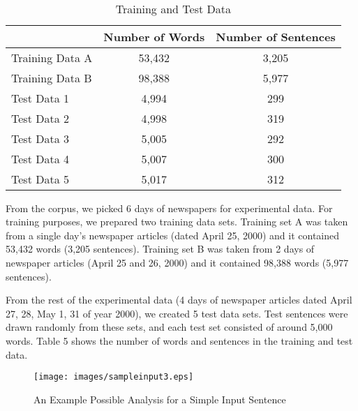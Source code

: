 \documentclass[english]{nlp}
\begin{document}
\begin{table}[ht]
\begin{center}
\caption{Training and Test Data}
~\\\vspace{-2mm}
\label{table:train_test_data}
\begin{tabular}{|l|c|c|}
\cline{2-3}
\multicolumn{1}{c|}{~} & {\small Number of Words} & {\small Number of Sentences}\\
\hline
\hline
{\small Training Data A} & {\small 53,432} & {\small 3,205}\\
\hline
{\small Training Data B} & {\small 98,388} & {\small 5,977}\\
\hline
\hline
{\small Test Data 1} & {\small 4,994} & {\small 299}\\
\hline
{\small Test Data 2} & {\small 4,998} & {\small 319}\\
\hline
{\small Test Data 3} & {\small 5,005} & {\small 292}\\
\hline
{\small Test Data 4} & {\small 5,007} & {\small 300}\\
\hline
{\small Test Data 5} & {\small 5,017} & {\small 312}\\
\hline
\end{tabular}
\end{center}
\end{table}

From the corpus, we picked 6 days of newspapers for experimental data.
For training purposes, we prepared two training data sets. Training set A
was taken from a single day's newspaper articles (dated April 25, 2000) and it
contained 53,432 words (3,205 sentences). 
Training set B was taken from 2 days of newspaper articles (April 25 and 26,
2000) and it contained 98,388 words (5,977 sentences).

From the rest of the experimental data (4 days of newspaper articles dated April
27, 28, May 1, 31 of year 2000), we created 5 test data sets.
Test sentences were drawn randomly from these sets, and each test set
consisted of around 5,000 words.
Table 5 shows the number of words and sentences in the training and test data.

\begin{figure}[htbp]
\begin{center}
\centerline{}
\texttt{[image: images/sampleinput3.eps]}
\caption{An Example Possible Analysis for a Simple Input Sentence}
\label{fig:sampleinputsent}
\end{center}
\end{figure}
\end{document}
